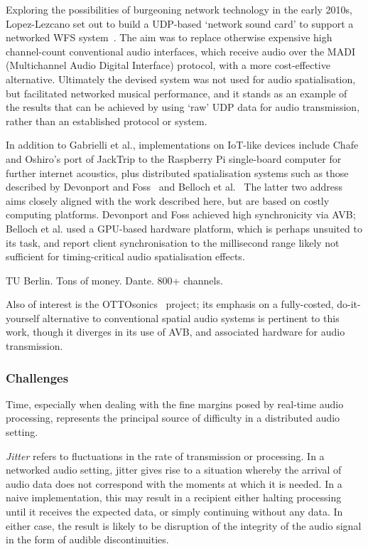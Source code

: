 Exploring the possibilities of burgeoning network technology in the early 2010s,
Lopez-Lezcano set out to build a UDP-based `network sound card' to support
a networked WFS system~\citep{lopez-lezcano_jack_2012}.
The aim was to replace otherwise expensive high channel-count conventional
audio interfaces, which receive audio over the MADI (Multichannel Audio Digital
Interface) protocol, with a more cost-effective alternative.
Ultimately the devised system was not used for audio spatialisation, but
facilitated networked musical performance, and it stands as an example of the
results that can be achieved by using `raw' UDP data for audio transmission,
rather than an established protocol or system.

In addition to Gabrielli et al., implementations on IoT-like devices include
Chafe and Oshiro's port of JackTrip to the Raspberry Pi single-board computer
for further internet acoustics, plus distributed spatialisation systems such as
those described by Devonport and Foss~\citep{devonport_distribution_2019} and
Belloch et al.~\citep{belloch_performance_2021}
The latter two address aims closely aligned with the work described here, but
are based on costly computing platforms.
Devonport and Foss achieved high synchronicity via AVB; Belloch et al. used a
GPU-based hardware platform, which is perhaps unsuited to its task, and report
client synchronisation to the millisecond range \textemdash{} likely not
sufficient for timing-critical audio spatialisation effects.

TU Berlin.
Tons of money.
Dante.
800+ channels.

Also of interest is the OTTOsonics~\citep{mitterhuber_ottosonics_2022}
project;
its emphasis on a fully-costed, do-it-yourself alternative to conventional
spatial audio systems is pertinent to this work, though it diverges in its use
of AVB, and associated hardware for audio transmission.

\subsubsection{Challenges}\label{subsec:challenges}

Time, especially when dealing with the fine margins posed by real-time audio
processing, represents the principal source of difficulty in a distributed
audio setting.

\textit{Jitter} refers to fluctuations in the rate of transmission or
processing.
In a networked audio setting, jitter gives rise to a situation whereby the
arrival of audio data does not correspond with the moments at which it is
needed.
In a naive implementation, this may result in a recipient either halting
processing until it receives the expected data, or simply continuing without
any data.
In either case, the result is likely to be disruption of the integrity of the
audio signal in the form of audible discontinuities.

